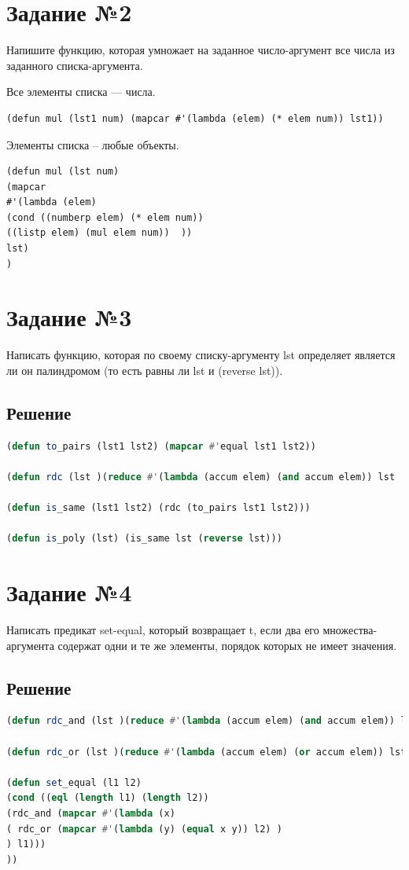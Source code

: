 \documentclass[12pt]{report}
\begin{document}
\section*{Задание №2}
Напишите функцию, которая умножает на заданное число-аргумент все числа
из заданного списка-аргумента.

Все элементы списка --- числа.
\begin{lstlisting}
(defun mul (lst1 num) (mapcar #'(lambda (elem) (* elem num)) lst1))

\end{lstlisting}

Элементы списка -- любые объекты.

\begin{lstlisting}
(defun mul (lst num) 
(mapcar 
#'(lambda (elem) 
(cond ((numberp elem) (* elem num)) 
((listp elem) (mul elem num))  ))
lst)
)
\end{lstlisting}


\section*{Задание №3}
Написать функцию, которая по своему списку-аргументу lst определяет
является ли он палиндромом (то есть равны ли lst и (reverse lst)).
\subsection*{Решение}
\begin{lstlisting}[label=third,caption=Решение задания №3, language=lisp]
(defun to_pairs (lst1 lst2) (mapcar #'equal lst1 lst2))

(defun rdc (lst )(reduce #'(lambda (accum elem) (and accum elem)) lst :initial-value T))

(defun is_same (lst1 lst2) (rdc (to_pairs lst1 lst2)))
	   
(defun is_poly (lst) (is_same lst (reverse lst)))
\end{lstlisting}

\section*{Задание №4}
Написать предикат set-equal, который возвращает t, если два его множества-
аргумента содержат одни и те же элементы, порядок которых не имеет значения.

\subsection*{Решение}
\begin{lstlisting}[label=third,caption=Решение задания №4, language=lisp]
(defun rdc_and (lst )(reduce #'(lambda (accum elem) (and accum elem)) lst :initial-value T))

(defun rdc_or (lst )(reduce #'(lambda (accum elem) (or accum elem)) lst :initial-value nil))

(defun set_equal (l1 l2)
(cond ((eql (length l1) (length l2))
(rdc_and (mapcar #'(lambda (x) 
( rdc_or (mapcar #'(lambda (y) (equal x y)) l2) )
) l1)))
))
\end{lstlisting}
\end{document}
